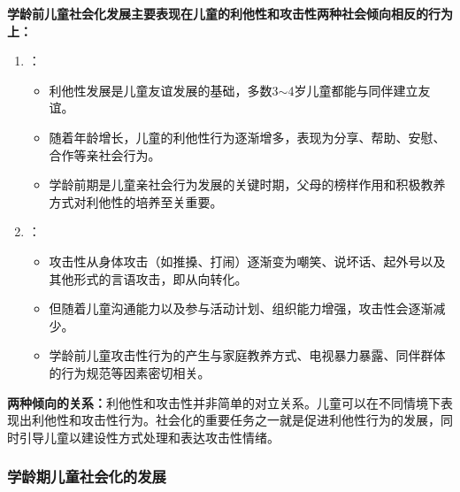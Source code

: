 \begin{defbox}
\textbf{学龄前儿童社会化发展主要表现在儿童的利他性和攻击性两种社会倾向相反的行为上：}

\begin{enumerate}[leftmargin=*]
    \item {}：
    \begin{itemize}[leftmargin=*]
        \item 利他性发展是儿童友谊发展的基础，多数3$\sim$4岁儿童都能与同伴建立友谊。
        \item 随着年龄增长，儿童的利他性行为逐渐增多，表现为分享、帮助、安慰、合作等亲社会行为。
        \item 学龄前期是儿童亲社会行为发展的关键时期，父母的榜样作用和积极教养方式对利他性的培养至关重要。
    \end{itemize}

    \item {}：
    \begin{itemize}[leftmargin=*]
        \item 攻击性从身体攻击（如推搡、打闹）逐渐变为嘲笑、说坏话、起外号以及其他形式的言语攻击，即从向转化。
        \item 但随着儿童沟通能力以及参与活动计划、组织能力增强，攻击性会逐渐减少。
        \item 学龄前儿童攻击性行为的产生与家庭教养方式、电视暴力暴露、同伴群体的行为规范等因素密切相关。
    \end{itemize}
\end{enumerate}

\textbf{两种倾向的关系：}利他性和攻击性并非简单的对立关系。儿童可以在不同情境下表现出利他性和攻击性行为。社会化的重要任务之一就是促进利他性行为的发展，同时引导儿童以建设性方式处理和表达攻击性情绪。
\end{defbox}

\subsubsection{学龄期儿童社会化的发展}

